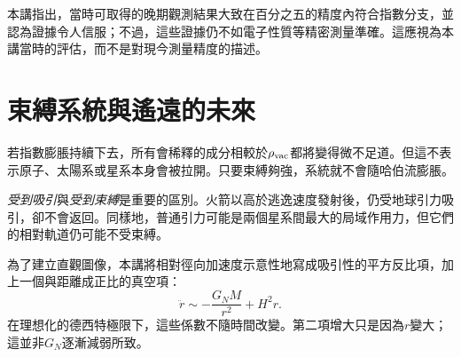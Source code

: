 本講指出，當時可取得的晚期觀測結果大致在百分之五的精度內符合指數分支，並認為證據令人信服；不過，這些證據仍不如電子性質等精密測量準確。這應視為本講當時的評估，而不是對現今測量精度的描述。

\begin{classroomqa}
\end{classroomqa}

\section{束縛系統與遙遠的未來}

若指數膨脹持續下去，所有會稀釋的成分相較於\(\rho_{\rm vac}\)都將變得微不足道。但這不表示原子、太陽系或星系本身會被拉開。只要束縛夠強，系統就不會隨哈伯流膨脹。

\begin{classroomqa}
\end{classroomqa}

\emph{受到吸引}與\emph{受到束縛}是重要的區別。火箭以高於逃逸速度發射後，仍受地球引力吸引，卻不會返回。同樣地，普通引力可能是兩個星系間最大的局域作用力，但它們的相對軌道仍可能不受束縛。

\begin{classroomqa}
\end{classroomqa}

為了建立直觀圖像，本講將相對徑向加速度示意性地寫成吸引性的平方反比項，加上一個與距離成正比的真空項：
\begin{equation}
\ddot r\sim-\frac{G_NM}{r^2}+H^2r.
\label{eq:l08-newtonian-vacuum}
\end{equation}
在理想化的德西特極限下，這些係數不隨時間改變。第二項增大只是因為\(r\)變大；這並非\(G_N\)逐漸減弱所致。

